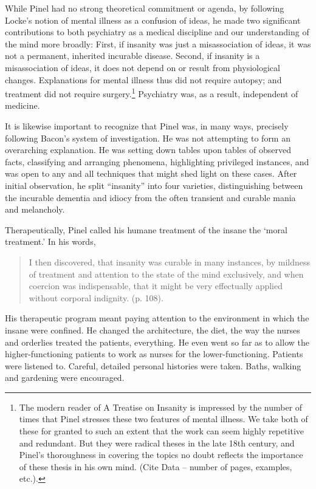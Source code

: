\begin{refsection}
While Pinel had no strong theoretical commitment or agenda, by following Locke's notion of mental illness as a confusion of ideas, he made two significant contributions to both psychiatry as a medical discipline and our understanding of the mind more broadly: First, if insanity was just a misassociation of ideas, it was not a permanent, inherited incurable disease. Second, if insanity is a misassociation of ideas, it does not depend on or result from physiological changes. Explanations for mental illness thus did not require autopsy; and treatment did not require surgery.\footnote{The modern reader of A Treatise on Insanity is impressed by the number of times that Pinel stresses these two features of mental illness. We take both of these for granted to such an extent that the work can seem highly repetitive and redundant. But they were radical theses in the late 18th century, and Pinel's thoroughness in covering the topics no doubt reflects the importance of these thesis in his own mind. (Cite Data – number of pages, examples, etc.).} Psychiatry was, as a result, independent of medicine.

It is likewise important to recognize that Pinel was, in many ways, precisely following Bacon's system of investigation. He was not attempting to form an overarching explanation. He was setting down tables upon tables of observed facts, classifying and arranging phenomena, highlighting privileged instances, and was open to any and all techniques that might shed light on these cases. After initial observation, he split “insanity” into four varieties, distinguishing between the incurable dementia and idiocy from the often transient and curable mania and melancholy.

Therapeutically, Pinel called his humane treatment of the insane the `moral treatment.' In his words,

\begin{quote}

I then discovered, that insanity was curable in many instances, by mildness of treatment and attention to the state of the mind exclusively, and when coercion was indispensable, that it might be very effectually applied without corporal indignity. (p. 108).
\end{quote}

His therapeutic program meant paying attention to the environment in which the insane were confined. He changed the architecture, the diet, the way the nurses and orderlies treated the patients, everything. He even went so far as to allow the higher-functioning patients to work as nurses for the lower-functioning. Patients were listened to. Careful, detailed personal histories were taken. Baths, walking and gardening were encouraged.


\end{refsection}
